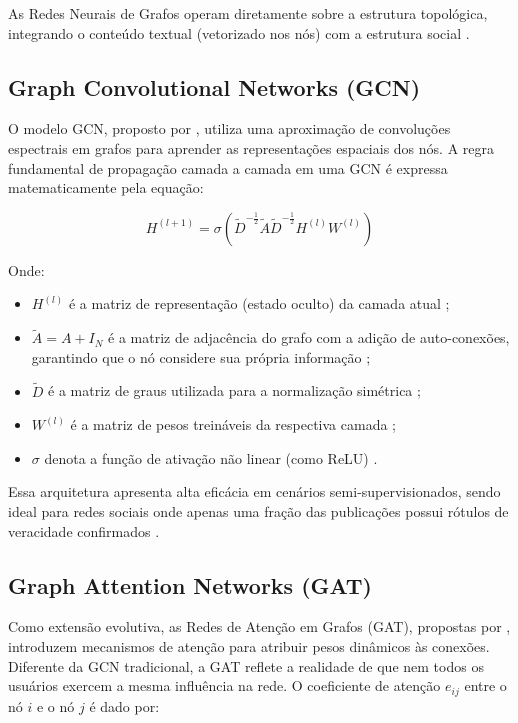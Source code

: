 As Redes Neurais de Grafos operam diretamente sobre a estrutura topológica, integrando o conteúdo textual (vetorizado nos nós) com a estrutura social \cite{pmc_gnnsurveyfakenews, monti2019fakenews}.

\subsection{Graph Convolutional Networks (GCN)}

O modelo GCN, proposto por , utiliza uma aproximação de convoluções espectrais em grafos para aprender as representações espaciais dos nós. A regra fundamental de propagação camada a camada em uma GCN é expressa matematicamente pela equação:

\begin{equation}
H^{(l+1)} = \sigma \left( \tilde{D}^{-\frac{1}{2}} \tilde{A} \tilde{D}^{-\frac{1}{2}} H^{(l)} W^{(l)} \right)
\end{equation}

Onde:
\begin{itemize}
    \item $H^{(l)}$ é a matriz de representação (estado oculto) da camada atual \cite{kipf2017gcn};
    \item $\tilde{A} = A + I_N$ é a matriz de adjacência do grafo com a adição de auto-conexões, garantindo que o nó considere sua própria informação \cite{kipf2017gcn};
    \item $\tilde{D}$ é a matriz de graus utilizada para a normalização simétrica \cite{kipf2017gcn};
    \item $W^{(l)}$ é a matriz de pesos treináveis da respectiva camada \cite{kipf2017gcn};
    \item $\sigma$ denota a função de ativação não linear (como ReLU) \cite{kipf2017gcn}.
\end{itemize}

Essa arquitetura apresenta alta eficácia em cenários semi-supervisionados, sendo ideal para redes sociais onde apenas uma fração das publicações possui rótulos de veracidade confirmados \cite{pmc_pulpfakenews}.

\subsection{Graph Attention Networks (GAT)}

Como extensão evolutiva, as Redes de Atenção em Grafos (GAT), propostas por , introduzem mecanismos de atenção para atribuir pesos dinâmicos às conexões. Diferente da GCN tradicional, a GAT reflete a realidade de que nem todos os usuários exercem a mesma influência na rede. O coeficiente de atenção $e_{ij}$ entre o nó $i$ e o nó $j$ é dado por:

